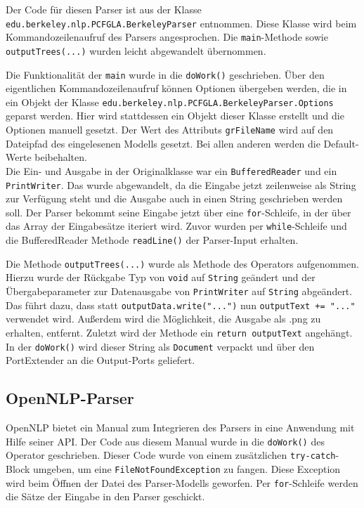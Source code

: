 Der Code für diesen Parser ist aus der Klasse \texttt{edu.berkeley.nlp.PCFGLA.BerkeleyParser} entnommen. Diese Klasse wird beim Kommandozeilenaufruf des Parsers angesprochen. Die \texttt{main}-Methode sowie \texttt{outputTrees(...)} wurden leicht abgewandelt übernommen. 

Die Funktionalität der \texttt{main} wurde in die \texttt{doWork()} geschrieben. Über den eigentlichen Kommandozeilenaufruf können Optionen übergeben werden, die in ein Objekt der Klasse \texttt{edu.berkeley.nlp.PCFGLA.BerkeleyParser.Options} geparst werden. Hier wird stattdessen ein Objekt dieser Klasse erstellt und die Optionen manuell gesetzt. Der Wert des Attributs \texttt{grFileName} wird auf den Dateipfad des eingelesenen Modells gesetzt. Bei allen anderen werden die Default-Werte beibehalten.\\ 
Die Ein- und Ausgabe in der Originalklasse war ein \texttt{BufferedReader} und ein \texttt{PrintWriter}. Das wurde abgewandelt, da die Eingabe jetzt zeilenweise als String zur Verfügung steht und die Ausgabe auch in einen String geschrieben werden soll. Der Parser bekommt seine Eingabe jetzt über eine \texttt{for}-Schleife, in der über das Array der Eingabesätze iteriert wird. Zuvor wurden per \texttt{while}-Schleife und die BufferedReader Methode \texttt{readLine()} der Parser-Input erhalten.

Die Methode \texttt{outputTrees(...)} wurde als Methode des Operators aufgenommen. Hierzu wurde der Rückgabe Typ von \texttt{void} auf \texttt{String} geändert und der Übergabeparameter zur Datenausgabe von \texttt{PrintWriter} auf \texttt{String} abgeändert. Das führt dazu, dass statt \texttt{outputData.write("...")} nun \texttt{outputText += "..."} verwendet wird. Außerdem wird die Möglichkeit, die Ausgabe als .png zu erhalten, entfernt. Zuletzt wird der Methode ein \texttt{return outputText} angehängt. In der \texttt{doWork()} wird dieser String als \texttt{Document} verpackt und über den PortExtender an die Output-Ports geliefert.

\subsection{OpenNLP-Parser}
\label{sec:impl:eigene:opennlp}

OpenNLP bietet ein Manual zum Integrieren des Parsers in eine Anwendung mit Hilfe seiner API. %
Der Code aus diesem Manual wurde in die \texttt{doWork()} des Operator geschrieben. Dieser Code wurde von einem zusätzlichen \texttt{try-catch}-Block umgeben, um eine \texttt{FileNotFoundException} zu fangen. Diese Exception wird beim Öffnen der Datei des Parser-Modells geworfen. Per \texttt{for}-Schleife werden die Sätze der Eingabe in den Parser geschickt. 

